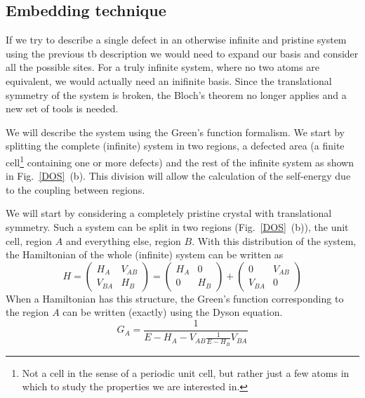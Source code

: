 \subsection{Embedding technique}
If we try to describe a single defect in an otherwise infinite and pristine system using the previous \ac{tb} description we would need to expand our basis and consider all the possible sites. For a truly infinite system, where no two atoms are equivalent, we would actually need an inifinite basis.
Since the translational symmetry of the system is broken, the Bloch's theorem no longer applies and a new set of tools is needed.

We will describe the system using the Green's function formalism. We start by splitting the complete (infinite) system in two regions, a defected area (a finite cell\footnote{Not a cell in the sense of a periodic unit cell, but rather just a few atoms in which to study the properties we are interested in.} containing one or more defects) and the rest of the infinite system as shown in Fig.~\ref{DOS}~(b). This division will allow the calculation of the self-energy due to the coupling between regions.

We will start by considering a completely pristine crystal with translational symmetry. Such a system can be split in two regions (Fig.~\ref{DOS}~(b)), the unit cell, region $A$ and everything else, region $B$.
With this distribution of the system, the Hamiltonian of the whole (infinite) system can be written as
\begin{equation}
  H = \left(\begin{array}{cc}
     H_{A} & V_{AB} \\
     V_{BA} & H_{B}
   \end{array}\right) =
  \left(\begin{array}{cc}
   H_{A} &  0  \\
    0     & H_{B}
  \end{array}\right)+
  \left(\begin{array}{cc}
    0 & V_{AB} \\
   V_{BA} & 0
  \end{array}\right)
\end{equation}
When a Hamiltonian has this structure, the Green's function corresponding to the region $A$ can be written (exactly) using the Dyson equation.
\begin{equation}
  G_{A} = \frac{1}{E-H_{A}-V_{AB}\frac{1}{E-H_{B}}V_{BA}}
\end{equation}

